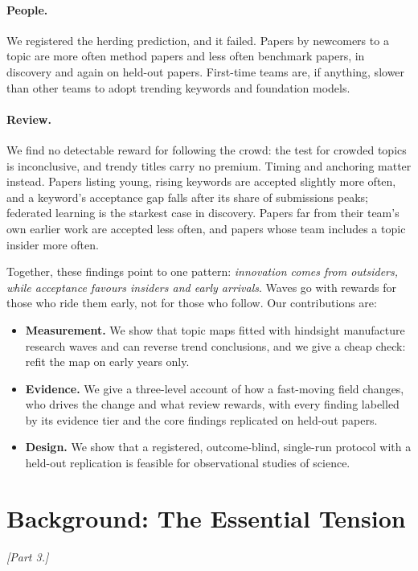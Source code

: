 \documentclass[11pt]{article}
\newcommand{\todo}[1]{\textit{[#1]}}
\begin{document}
\paragraph{People.} We registered the herding prediction, and it failed. Papers by newcomers to a topic are more
often method papers and less often benchmark papers, in discovery and again on held-out papers. First-time teams are,
if anything, slower than other teams to adopt trending keywords and foundation models.

\paragraph{Review.} We find no detectable reward for following the crowd: the test for crowded topics is
inconclusive, and trendy titles carry no premium. Timing and anchoring matter instead. Papers listing young, rising
keywords are accepted slightly more often, and a keyword's acceptance gap falls after its share of submissions peaks;
federated learning is the starkest case in discovery. Papers far from their team's own earlier work are accepted less
often, and papers whose team includes a topic insider more often.

Together, these findings point to one pattern: \emph{innovation comes from outsiders, while acceptance favours
insiders and early arrivals}. Waves go with rewards for those who ride them early, not for those who follow. Our
contributions are:
\begin{itemize}
  \item \textbf{Measurement.} We show that topic maps fitted with hindsight manufacture research waves and can
    reverse trend conclusions, and we give a cheap check: refit the map on early years only.
  \item \textbf{Evidence.} We give a three-level account of how a fast-moving field changes, who drives the change and
    what review rewards, with every finding labelled by its evidence tier and the core findings replicated on
    held-out papers.
  \item \textbf{Design.} We show that a registered, outcome-blind, single-run protocol with a held-out replication
    is feasible for observational studies of science.
\end{itemize}

\section{Background: The Essential Tension}
\todo{Part 3.}
\end{document}
